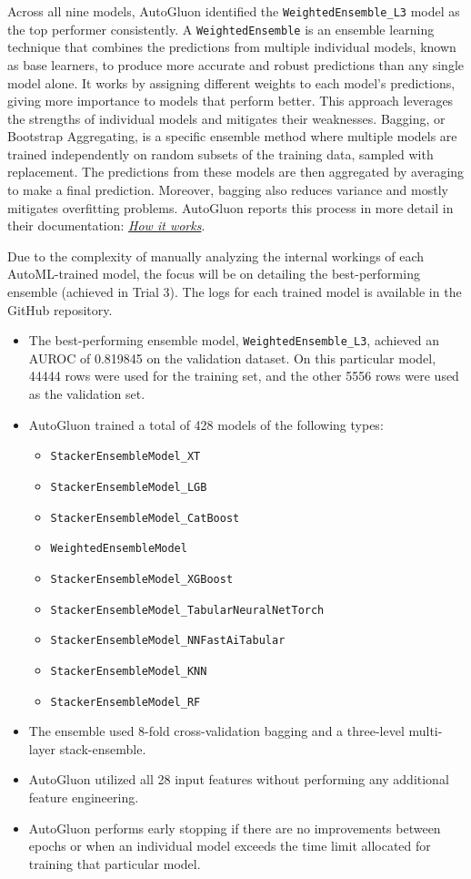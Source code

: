 \documentclass[letterpaper]{article}
\begin{document}
	Across all nine models, AutoGluon identified the \texttt{WeightedEnsemble\_L3} model as the top performer consistently. A \texttt{WeightedEnsemble} is an ensemble learning technique that combines the predictions from multiple individual models, known as base learners, to produce more accurate and robust predictions than any single model alone. It works by assigning different weights to each model's predictions, giving more importance to models that perform better. This approach leverages the strengths of individual models and mitigates their weaknesses. Bagging, or Bootstrap Aggregating, is a specific ensemble method where multiple models are trained independently on random subsets of the training data, sampled with replacement. The predictions from these models are then aggregated by averaging to make a final prediction. Moreover, bagging also reduces variance and mostly mitigates overfitting problems. AutoGluon reports this process in more detail in their documentation: \href{https://auto.gluon.ai/dev/tutorials/tabular/how-it-works.html}{\textit{How it works}}.
	
	Due to the complexity of manually analyzing the internal workings of each AutoML-trained model, the focus will be on detailing the best-performing ensemble (achieved in Trial 3). The logs for each trained model is available in the GitHub repository.
	
	\begin{itemize}
		\item The best-performing ensemble model, \texttt{WeightedEnsemble\_L3}, achieved an AUROC of 0.819845 on the validation dataset. On this particular model, 44444 rows were used for the training set, and the other 5556 rows were used as the validation set.
		\item AutoGluon trained a total of 428 models of the following types:
		\begin{itemize}
			\item \texttt{StackerEnsembleModel\_XT}
			\item \texttt{StackerEnsembleModel\_LGB}
			\item \texttt{StackerEnsembleModel\_CatBoost}
			\item \texttt{WeightedEnsembleModel}
			\item \texttt{StackerEnsembleModel\_XGBoost}
			\item \texttt{StackerEnsembleModel\_TabularNeuralNetTorch}
			\item \texttt{StackerEnsembleModel\_NNFastAiTabular}
			\item \texttt{StackerEnsembleModel\_KNN}
			\item \texttt{StackerEnsembleModel\_RF}
		\end{itemize}
		\item The ensemble used 8-fold cross-validation bagging and a three-level multi-layer stack-ensemble.
		\item AutoGluon utilized all 28 input features without performing any additional feature engineering.
		\item AutoGluon performs early stopping if there are no improvements between epochs or when an individual model exceeds the time limit allocated for training that particular model.
	\end{itemize}
	
\end{document}
